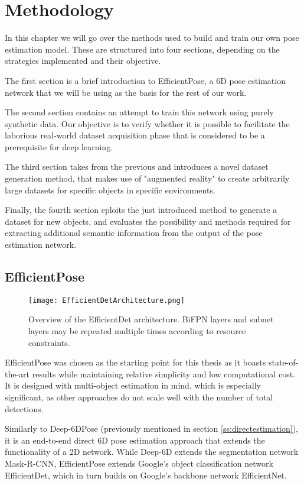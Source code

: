 \chapter{Methodology}

In this chapter we will go over the methods used to build and train our own pose estimation model. These are structured into four sections, depending on the strategies implemented and their objective.

The first section is a brief introduction to EfficientPose, a 6D pose estimation network that we will be using as the basis for the rest of our work.

The second section contains an attempt to train this network using purely synthetic data. Our objective is to verify whether it is possible to facilitate the laborious real-world dataset acquisition phase that is considered to be a prerequisite for deep learning.

The third section takes from the previous and introduces a novel dataset generation method, that makes use of "augmented reality" to create arbitrarily large datasets for specific objects in specific environments.

Finally, the fourth section eploits the just introduced method to generate a dataset for new objects, and evaluates the possibility and methods required for extracting additional semantic information from the output of the pose estimation network.

\section{EfficientPose}

\begin{figure}[ht]
    \centering
    \texttt{[image: EfficientDetArchitecture.png]}
    \caption{Overview of the EfficientDet architecture. BiFPN layers and subnet layers may be repeated multiple times according to resource constraints.}
    \label{effdet}
\end{figure}

EfficientPose was chosen as the starting point for this thesis as it boasts state-of-the-art results while maintaining relative simplicity and low computational cost. It is designed with multi-object estimation in mind, which is especially significant, as other approaches do not scale well with the number of total detections.

Similarly to Deep-6DPose (previously mentioned in section \ref*{ss:directestimation}), it is an end-to-end direct 6D pose estimation approach that extends the functionality of a 2D network. While Deep-6D extends the segmentation network Mask-R-CNN, EfficientPose extends Google's object classification network EfficientDet\cite{EfficientDet}, which in turn builds on Google's backbone network EfficientNet\cite{EfficientNet}.

